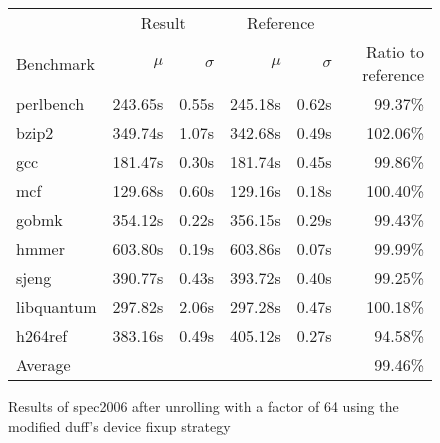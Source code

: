 \begin{figure}[h]
    \begin{center}
        \begin{tabular}{lrrrrr}
            \toprule
            & \multicolumn{2}{c}{Result} & \multicolumn{2}{c}{Reference}\\
            Benchmark & $\mu$ & $\sigma$ & $\mu$ & $\sigma$ & Ratio to reference\\
            \midrule
            perlbench & 243.65s & 0.55s & 245.18s & 0.62s & 99.37\%\\
            bzip2 & 349.74s & 1.07s & 342.68s & 0.49s & 102.06\%\\
            gcc & 181.47s & 0.30s & 181.74s & 0.45s & 99.86\%\\
            mcf & 129.68s & 0.60s & 129.16s & 0.18s & 100.40\%\\
            gobmk & 354.12s & 0.22s & 356.15s & 0.29s & 99.43\%\\
            hmmer & 603.80s & 0.19s & 603.86s & 0.07s & 99.99\%\\
            sjeng & 390.77s & 0.43s & 393.72s & 0.40s & 99.25\%\\
            libquantum & 297.82s & 2.06s & 297.28s & 0.47s & 100.18\%\\
            h264ref & 383.16s & 0.49s & 405.12s & 0.27s & 94.58\%\\
            \midrule
            Average & & & & & 99.46\%\\
            \bottomrule
        \end{tabular}
    \end{center}
    \caption{Results of spec2006 after unrolling with a factor of 64 using the modified duff's device fixup strategy}
    \label{fig:eval:perf:duff:64}
\end{figure}
